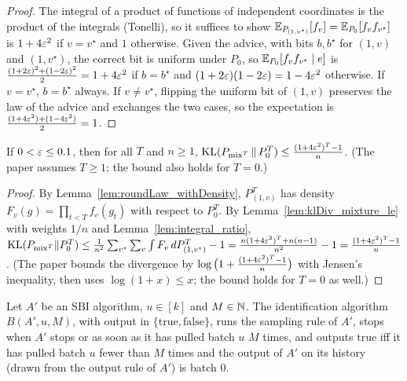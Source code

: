 \begin{proof}
  \leanok
  The integral of a product of functions of independent coordinates is the product of the
  integrals (Tonelli), so it suffices to show $\mathbb{E}_{P_{(1,v^\star)}}[f_v] =
  \mathbb{E}_{P_0}[f_v f_{v^\star}]$ is $1 + 4 \varepsilon^2$ if $v = v^\star$ and $1$ otherwise. Given the advice,
  with bits $b, b^\star$ for $(1, v)$ and $(1, v^\star)$, the correct bit is uniform under $P_0$, so
  $\mathbb{E}_{P_0}[f_v f_{v^\star} \mid e]$ is $\frac{(1 + 2\varepsilon)^2 + (1 - 2\varepsilon)^2}{2} = 1 + 4\varepsilon^2$ if
  $b = b^\star$ and $(1 + 2\varepsilon)(1 - 2\varepsilon) = 1 - 4\varepsilon^2$ otherwise. If $v = v^\star$, $b = b^\star$
  always. If $v \ne v^\star$, flipping the uniform bit of $(1, v)$ preserves the law of the advice
  and exchanges the two cases, so the expectation is
  $\frac{(1 + 4\varepsilon^2) + (1 - 4\varepsilon^2)}{2} = 1$.
\end{proof}

\begin{lemma}
  \label{lem:kl_bound}
  \leanok
  If $0 < \varepsilon \le 0.1$, then for all $T$ and $n \ge 1$,
  $\mathrm{KL}(P_{\mathrm{mix}^T} \,\|\, P_0^T) \le \frac{(1 + 4\varepsilon^2)^T - 1}{n}$. (The paper assumes $T \ge 1$;
  the bound also holds for $T = 0$.)
\end{lemma}

\begin{proof}
  \leanok
  By Lemma~\ref{lem:roundLaw_withDensity}, $P_{(1,v)}^T$ has density
  $F_v(g) = \prod_{t < T} f_v(g_t)$ with respect to $P_0^T$. By Lemma~\ref{lem:klDiv_mixture_le}
  with weights $1/n$ and Lemma~\ref{lem:integral_ratio},
  $\mathrm{KL}(P_{\mathrm{mix}^T} \| P_0^T) \le \frac1{n^2} \sum_{v^\star} \sum_v \int F_v \, dP_{(1,v^\star)}^T - 1
  = \frac{n (1 + 4\varepsilon^2)^T + n (n - 1)}{n^2} - 1 = \frac{(1 + 4\varepsilon^2)^T - 1}{n}$. (The paper
  bounds the divergence by $\log\big(1 + \frac{(1 + 4\varepsilon^2)^T - 1}{n}\big)$ with Jensen's
  inequality, then uses $\log(1 + x) \le x$; the bound holds for $T = 0$ as well.)
\end{proof}

\begin{definition}
  \label{def:stop_at_pulls}
  \leanok
  Let $A'$ be an SBI algorithm, $u \in [k]$ and $M \in \mathbb{N}$. The identification algorithm
  $B(A', u, M)$, with output in $\{\mathrm{true}, \mathrm{false}\}$, runs the sampling rule of
  $A'$, stops when $A'$ stops or as soon as it has pulled batch $u$ $M$ times, and outputs
  $\mathrm{true}$ iff it has pulled batch $u$ fewer than $M$ times and the output of $A'$ on its
  history (drawn from the output rule of $A'$) is batch $0$.
\end{definition}

